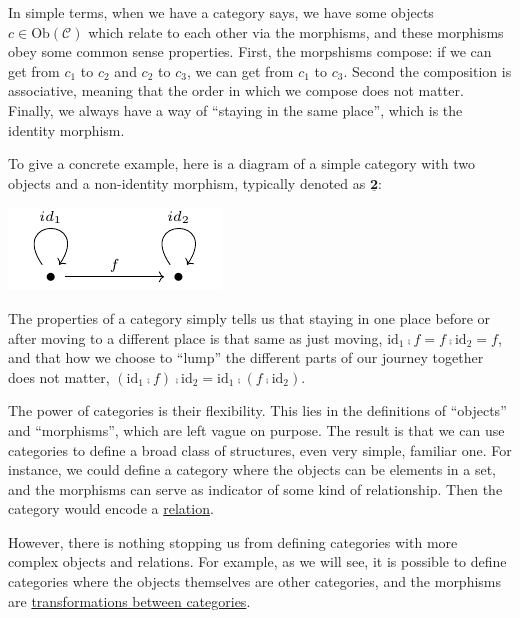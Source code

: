 \documentclass[
]{book}
\theoremstyle{definition}
\theoremstyle{definition}
\theoremstyle{definition}
\theoremstyle{definition}
\theoremstyle{remark}
\begin{document}
In simple terms, when we have a category says, we have some objects \(c \in \text{Ob}(\mathcal{C})\) which relate to each other via the morphisms, and these morphisms obey some common sense properties. First, the morpshisms compose: if we can get from \(c_1\) to \(c_2\) and \(c_2\) to \(c_3\), we can get from \(c_1\) to \(c_3\). Second the composition is associative, meaning that the order in which we compose does not matter. Finally, we always have a way of ``staying in the same place'', which is the identity morphism.

To give a concrete example, here is a diagram of a simple category with two objects and a non-identity morphism, typically denoted as \(\underline{\textbf{2}}\):

\begin{center}\includegraphics[width=1\linewidth,height=1\textheight]{./figures/category-two} \end{center}

The properties of a category simply tells us that staying in one place before or after moving to a different place is that same as just moving, \(\text{id}_1 ⨾f = f ⨾\text{id}_2 = f\), and that how we choose to ``lump'' the different parts of our journey together does not matter, \((\text{id}_1 ⨾f) ⨾\text{id}_2 = \text{id}_1 ⨾(f ⨾\text{id}_2)\).

The power of categories is their flexibility. This lies in the definitions of ``objects'' and ``morphisms'', which are left vague on purpose. The result is that we can use categories to define a broad class of structures, even very simple, familiar one. For instance, we could define a category where the objects can be elements in a set, and the morphisms can serve as indicator of some kind of relationship. Then the category would encode a \hyperref[relations]{relation}.

However, there is nothing stopping us from defining categories with more complex objects and relations. For example, as we will see, it is possible to define categories where the objects themselves are other categories, and the morphisms are \hyperref[functors]{transformations between categories}.
\end{document}
